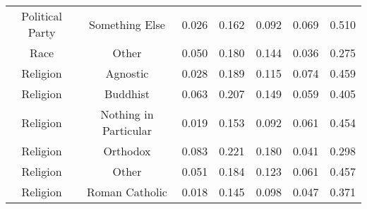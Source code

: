 \begin{table*}[ht]
\begin{tabular}{cc ccc cc}
    Political Party & Something Else & 0.026 & 0.162 & 0.092 & 0.069 & 0.510 \\
    Race & Other & 0.050 & 0.180 & 0.144 & 0.036 & 0.275 \\
    Religion & Agnostic & 0.028 & 0.189 & 0.115 & 0.074 & 0.459 \\
    Religion & Buddhist & 0.063 & 0.207 & 0.149 & 0.059 & 0.405 \\
    Religion & Nothing in Particular & 0.019 & 0.153 & 0.092 & 0.061 & 0.454 \\
    Religion & Orthodox & 0.083 & 0.221 & 0.180 & 0.041 & 0.298 \\
    Religion & Other & 0.051 & 0.184 & 0.123 & 0.061 & 0.457 \\
    Religion & Roman Catholic & 0.018 & 0.145 & 0.098 & 0.047 & 0.371 \\
    \bottomrule    
    \end{tabular}
\end{table*}
